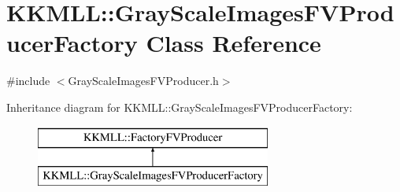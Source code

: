 \hypertarget{class_k_k_m_l_l_1_1_gray_scale_images_f_v_producer_factory}{}\section{K\+K\+M\+LL\+:\+:Gray\+Scale\+Images\+F\+V\+Producer\+Factory Class Reference}
\label{class_k_k_m_l_l_1_1_gray_scale_images_f_v_producer_factory}


{\ttfamily \#include $<$Gray\+Scale\+Images\+F\+V\+Producer.\+h$>$}

Inheritance diagram for K\+K\+M\+LL\+:\+:Gray\+Scale\+Images\+F\+V\+Producer\+Factory\+:\begin{figure}[H]
\begin{center}
\leavevmode
\includegraphics[height=2.000000cm]{class_k_k_m_l_l_1_1_gray_scale_images_f_v_producer_factory}
\end{center}
\end{figure}
